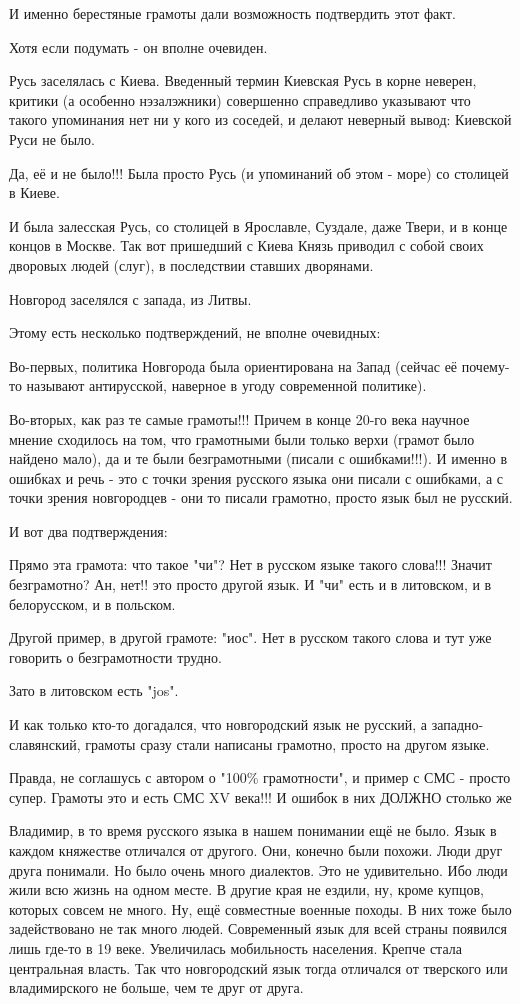 \begin{itemize}
И именно берестяные грамоты дали возможность подтвердить этот факт.

Хотя если подумать - он вполне очевиден.

Русь заселялась с Киева. Введенный термин Киевская Русь в корне неверен,
критики (а особенно нэзалэжники) совершенно справедливо указывают что такого
упоминания нет ни у кого из соседей, и делают неверный вывод: Киевской Руси не
было.

Да, её и не было!!! Была просто Русь (и упоминаний об этом - море) со столицей
в Киеве.

И была залесская Русь, со столицей в Ярославле, Суздале, даже Твери, и в конце
концов в Москве. Так вот пришедший с Киева Князь приводил с собой своих
дворовых людей (слуг), в последствии ставших дворянами.

Новгород заселялся с запада, из Литвы.

Этому есть несколько подтверждений, не вполне очевидных:

Во-первых, политика Новгорода была ориентирована на Запад (сейчас её почему-то
называют антирусской, наверное в угоду современной политике).

Во-вторых, как раз те самые грамоты!!! Причем в конце 20-го века научное мнение
сходилось на том, что грамотными были только верхи (грамот было найдено мало),
да и те были безграмотными (писали с ошибками!!!). И именно в ошибках и речь -
это с точки зрения русского языка они писали с ошибками, а с точки зрения
новгородцев - они то писали грамотно, просто язык был не русский.

И вот два подтверждения:

Прямо эта грамота: что такое "чи"? Нет в русском языке такого слова!!! Значит
безграмотно? Ан, нет!! это просто другой язык. И "чи" есть и в литовском, и в
белорусском, и в польском.

Другой пример, в другой грамоте: "иос". Нет в русском такого слова и тут уже
говорить о безграмотности трудно.

Зато в литовском есть "jos".

И как только кто-то догадался, что новгородский язык не русский, а
западно-славянский, грамоты сразу стали написаны грамотно, просто на другом
языке.

Правда, не соглашусь с автором о "100\% грамотности", и пример с СМС - просто
супер. Грамоты это и есть СМС XV века!!! И ошибок в них ДОЛЖНО столько же


Владимир, в то время русского языка в нашем понимании ещё не было. Язык в
каждом княжестве отличался от другого. Они, конечно были похожи. Люди друг
друга понимали. Но было очень много диалектов. Это не удивительно. Ибо люди
жили всю жизнь на одном месте. В другие края не ездили, ну, кроме купцов,
которых совсем не много. Ну, ещё совместные военные походы. В них тоже было
задействовано не так много людей. Современный язык для всей страны появился
лишь где-то в 19 веке. Увеличилась мобильность населения. Крепче стала
центральная власть. Так что новгородский язык тогда отличался от тверского или
владимирского не больше, чем те друг от друга.



\end{itemize}
